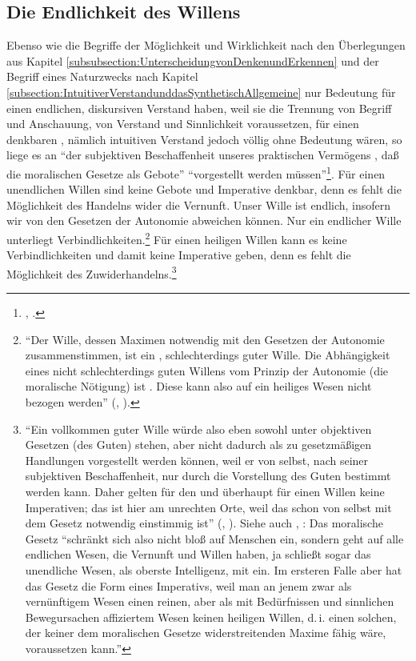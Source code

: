 \subsection{Die Endlichkeit des
Willens}\label{subsubsection:DieEndlichkeitdesWillens}
Ebenso wie die Begriffe der Möglichkeit und Wirklichkeit nach den Überlegungen
aus Kapitel \ref{subsubsection:UnterscheidungvonDenkenundErkennen} und der
Begriff eines Naturzwecks nach Kapitel
\ref{subsection:IntuitiverVerstandunddasSynthetischAllgemeine} nur Bedeutung für
einen endlichen, diskursiven Verstand haben, weil sie die Trennung von Begriff
und Anschauung, von Verstand und Sinnlichkeit voraussetzen, für einen denkbaren
, nämlich intuitiven Verstand jedoch völlig ohne Bedeutung
wären, so liege es an \enquote{der subjektiven
Beschaffenheit unseres praktischen Vermögens {\punkt}, daß die moralischen
Gesetze als Gebote} \enquote{vorgestellt werden
müssen}\footnote{\cite[][\S~76]{Kant:KritikderUrteilskraft2009}, \cite[][V:
403.30--32]{Kant:GesammelteWerke1900ff.}.}. Für einen unendlichen Willen sind
keine Gebote und Imperative denkbar, denn es fehlt die Möglichkeit des Handelns
wider die Vernunft. Unser Wille ist endlich, insofern wir von den Gesetzen der
Autonomie abweichen können. Nur ein endlicher Wille unterliegt
Verbindlichkeiten.\footnote{\enquote{Der Wille, dessen Maximen notwendig mit den Gesetzen der Autonomie
zusammenstimmen, ist ein , schlechterdings guter Wille. Die
Abhängigkeit eines nicht schlechterdings guten Willens vom Prinzip der Autonomie
(die moralische Nötigung) ist . Diese kann also auf ein
heiliges Wesen nicht bezogen werden} \mkbibparens{\cite[][BA
86]{Kant:GrundlegungzurMetaphysikderSitten1965}, \cite[][IV:
439.28--33]{Kant:GesammelteWerke1900ff.}}.}
Für einen heiligen Willen kann es keine Verbindlichkeiten und damit
keine Imperative geben, denn es fehlt die Möglichkeit des
Zuwiderhandelns.\footnote{\enquote{Ein vollkommen guter Wille würde also eben sowohl unter objektiven Gesetzen
(des Guten) stehen, aber nicht dadurch als zu gesetzmäßigen Handlungen
 vorgestellt werden können, weil er von selbst, nach seiner
subjektiven Beschaffenheit, nur durch die Vorstellung des Guten bestimmt werden
kann. Daher gelten für den  und überhaupt für einen
 Willen keine Imperativen; das  ist hier am unrechten
Orte, weil das  schon von selbst mit dem Gesetz notwendig einstimmig
ist} \mkbibparens{\cite[][BA 39]{Kant:GrundlegungzurMetaphysikderSitten1965},
\cite[][IV: 414.1--8]{Kant:GesammelteWerke1900ff.}}. Siehe auch
\cite[][A 57]{Kant:KritikderpraktischenVernunft1974},
\cite[][V: 32.15--21]{Kant:GesammelteWerke1900ff.}: Das moralische Gesetz
\enquote{schränkt sich also nicht bloß auf Menschen ein, sondern geht auf alle endlichen Wesen, die Vernunft und Willen
haben, ja schließt sogar das unendliche Wesen, als oberste Intelligenz, mit ein.
Im ersteren Falle aber hat das Gesetz die Form eines Imperativs, weil man an
jenem zwar als vernünftigem Wesen einen reinen, aber als mit Bedürfnissen und
sinnlichen Bewegursachen affiziertem Wesen keinen heiligen Willen, d.\,i. einen
solchen, der keiner dem moralischen Gesetze widerstreitenden Maxime fähig wäre,
voraussetzen kann.}}
